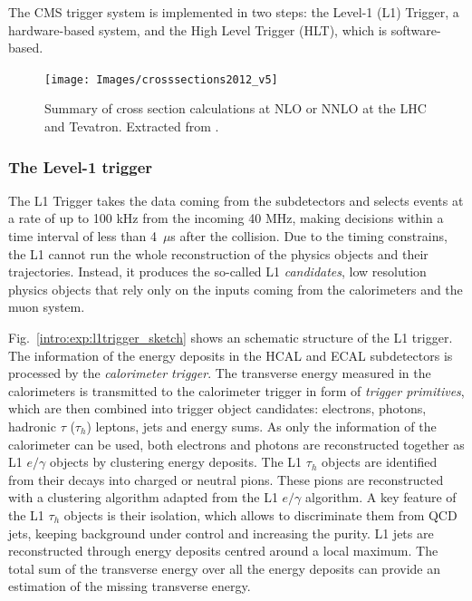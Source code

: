 \documentclass[../main.tex]{subfiles}
\begin{document}
The CMS trigger system \cite{intro:exp:cms_trigger} is implemented in two steps: the Level-1 (L1) Trigger, a hardware-based system, and the High Level Trigger (HLT), which is software-based.

\begin{figure}[h!]
\begin{center}
\texttt{[image: Images/crosssections2012\_v5]}
\end{center}
\caption[Cross sections summary]{Summary of cross section calculations at NLO or NNLO at the LHC and Tevatron. Extracted from \cite{intro:exp:xs}.}
\label{intro:exp:xs}
\end{figure}


\subsubsection{The Level-1 trigger}

The L1 Trigger takes the data coming from the subdetectors and selects events at a rate of up to 100 kHz from the incoming 40 MHz, making decisions within a time interval of less than 4~$\mu$s after the collision. Due to the timing constrains, the L1 cannot run the whole reconstruction of the physics objects and their trajectories. Instead, it produces the so-called L1 \textit{candidates}, low resolution physics objects that rely only on the inputs coming from the calorimeters and the muon system.


Fig.~\ref{intro:exp:l1trigger_sketch} shows an schematic structure of the L1 trigger. The information of the energy deposits in the HCAL and ECAL subdetectors is processed by the \textit{calorimeter trigger}. The transverse energy measured in the calorimeters is transmitted to the calorimeter trigger in form of \textit{trigger primitives}, which are then combined into trigger object candidates: electrons, photons, hadronic $\tau$ ($\tau_h$) leptons, jets and energy sums. As only the information of the calorimeter can be used, both electrons and photons are reconstructed together as L1 $e/\gamma$ objects by clustering energy deposits. The L1 $\tau_h$ objects are identified from their decays into charged or neutral pions. These pions are reconstructed with a clustering algorithm adapted from the L1 $e/\gamma$ algorithm. A key feature of the L1 $\tau_h$ objects is their isolation, which allows to discriminate them from QCD jets, keeping background under control and increasing the purity. L1 jets are reconstructed through energy deposits centred around a local maximum. The total sum of the transverse energy over all the energy deposits can provide an estimation of the missing transverse energy.
\end{document}
